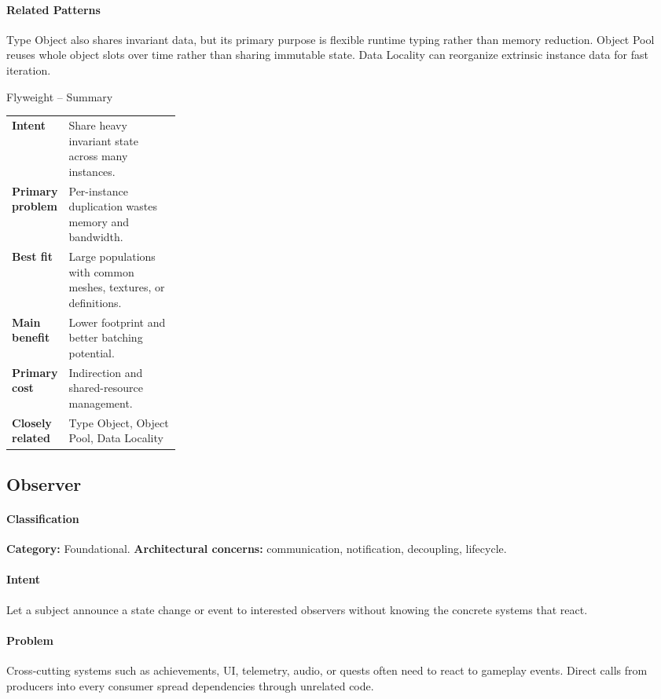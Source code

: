 \documentclass[11pt]{article}
\begin{document}
\paragraph{Related Patterns} Type Object also shares invariant data, but its primary purpose is flexible runtime typing rather than memory reduction. Object Pool reuses whole object slots over time rather than sharing immutable state. Data Locality can reorganize extrinsic instance data for fast iteration.

\begin{patternsummary}{Flyweight -- Summary}
\begin{tabularx}{\linewidth}{@{}>{\bfseries}p{0.25\linewidth}X@{}}
Intent & Share heavy invariant state across many instances. \\
Primary problem & Per-instance duplication wastes memory and bandwidth. \\
Best fit & Large populations with common meshes, textures, or definitions. \\
Main benefit & Lower footprint and better batching potential. \\
Primary cost & Indirection and shared-resource management. \\
Closely related & Type Object, Object Pool, Data Locality \\
\end{tabularx}
\end{patternsummary}

\subsection{Observer}\label{pat:observer}
\paragraph{Classification} \textbf{Category:} Foundational. \textbf{Architectural concerns:} communication, notification, decoupling, lifecycle.
\paragraph{Intent} Let a subject announce a state change or event to interested observers without knowing the concrete systems that react.
\paragraph{Problem} Cross-cutting systems such as achievements, UI, telemetry, audio, or quests often need to react to gameplay events. Direct calls from producers into every consumer spread dependencies through unrelated code.
\end{document}
